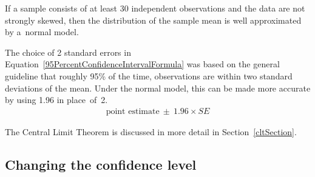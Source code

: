 \begin{spacing}{1.5}
\begin{termBox}{
If a sample consists of at least 30 independent observations and the data are not strongly skewed, then the distribution of the sample mean is well approximated by a~normal model.}
\end{termBox}

The choice of 2 standard errors in Equation~\ref{95PercentConfidenceIntervalFormula} was based on the general guideline that roughly 95\% of the time, observations are within two standard deviations of the mean. Under the normal model, this can be made more accurate by using 1.96 in place~of~2.
\begin{align}
\text{point estimate}\ \pm\ 1.96\times SE
\label{95PercentCIWhenUsingNormalModel}
\end{align}

The Central Limit Theorem is discussed in more detail in Section~\ref{cltSection}.

\subsection{Changing the confidence level}
\label{changingTheConfidenceLevelSection}





\end{spacing}
